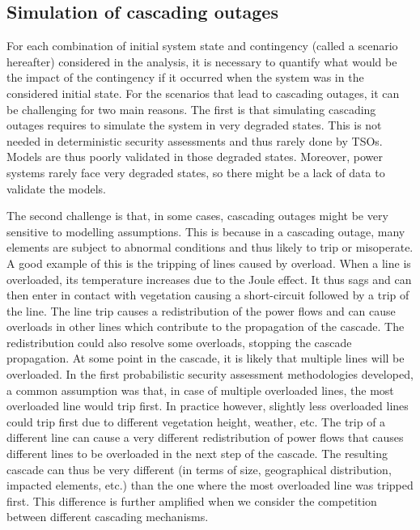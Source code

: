 

\subsection{Simulation of cascading outages}
\label{sec:cascading}

For each combination of initial system state and contingency (called a scenario hereafter) considered in the analysis, it is necessary to quantify what would be the impact of the contingency if it occurred when the system was in the considered initial state. For the scenarios that lead to cascading outages, it can be challenging for two main reasons. The first is that simulating cascading outages requires to simulate the system in very degraded states. This is not needed in deterministic security assessments and thus rarely done by TSOs. Models are thus poorly validated in those degraded states. Moreover, power systems rarely face very degraded states, so there might be a lack of data to validate the models.

The second challenge is that, in some cases, cascading outages might be very sensitive to modelling assumptions. This is because in a cascading outage, many elements are subject to abnormal conditions and thus likely to trip or misoperate. A good example of this is the tripping of lines caused by overload. When a line is overloaded, its temperature increases due to the Joule effect. It thus sags and can then enter in contact with vegetation causing a short-circuit followed by a trip of the line. The line trip causes a redistribution of the power flows and can cause overloads in other lines which contribute to the propagation of the cascade. The redistribution could also resolve some overloads, stopping the cascade propagation. At some point in the cascade, it is likely that multiple lines will be overloaded. In the first probabilistic security assessment methodologies developed, a common assumption was that, in case of multiple overloaded lines, the most overloaded line would trip first. In practice however, slightly less overloaded lines could trip first due to different vegetation height, weather, etc. The trip of a different line can cause a very different redistribution of power flows that causes different lines to be overloaded in the next step of the cascade. The resulting cascade can thus be very different (in terms of size, geographical distribution, impacted elements, etc.) than the one where the most overloaded line was tripped first. This difference is further amplified when we consider the competition between different cascading mechanisms.

